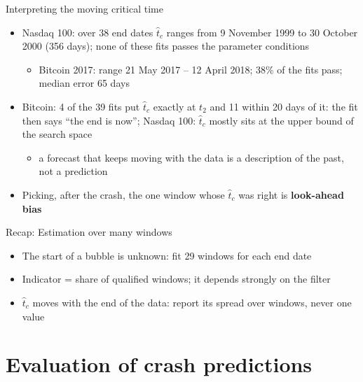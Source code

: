 \begin{frame}{Interpreting the moving critical time}
\itemsize{\small}
\begin{itemize}
    \item Nasdaq 100: over 38 end dates $\hat t_c$ ranges from 9 November 1999 to 30 October 2000 (356 days); none of these fits passes the parameter conditions
    \begin{itemize}
        \item Bitcoin 2017: range 21 May 2017 -- 12 April 2018; 38\% of the fits pass; median error 65 days
    \end{itemize}
    \item Bitcoin: 4 of the 39 fits put $\hat t_c$ exactly at $t_2$ and 11 within 20 days of it: the fit then says ``the end is now''; Nasdaq 100: $\hat t_c$ mostly sits at the upper bound of the search space
    \begin{itemize}
        \item a forecast that keeps moving with the data is a description of the past, not a prediction
    \end{itemize}
    \item Picking, after the crash, the one window whose $\hat t_c$ was right is \textbf{look-ahead bias}
\end{itemize}
\end{frame}

\begin{frame}{Recap: Estimation over many windows}
\itemsize{\small}
\begin{itemize}
    \item The start of a bubble is unknown: fit 29 windows for each end date
    \item Indicator = share of qualified windows; it depends strongly on the filter
    \item $\hat t_c$ moves with the end of the data: report its spread over windows, never one value
\end{itemize}
\end{frame}


\section{Evaluation of crash predictions}

